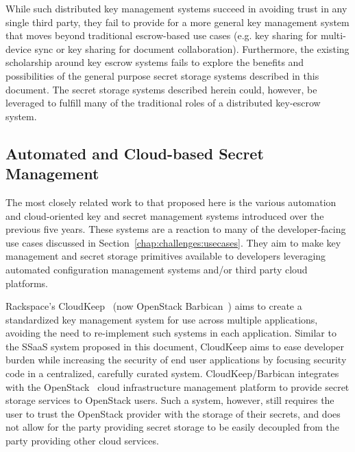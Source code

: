 While such distributed key management systems succeed in avoiding
trust in any single third party, they fail to provide for a more
general key management system that moves beyond traditional
escrow-based use cases (e.g. key sharing for multi-device sync or key
sharing for document collaboration). Furthermore, the existing
scholarship around key escrow systems fails to explore the benefits
and possibilities of the general purpose secret storage systems
described in this document. The secret storage systems described
herein could, however, be leveraged to fulfill many of the traditional
roles of a distributed key-escrow system.

\subsection{Automated and Cloud-based Secret Management}

The most closely related work to that proposed here is the various
automation and cloud-oriented key and secret management systems
introduced over the previous five years. These systems are a reaction
to many of the developer-facing use cases discussed in
Section~\ref{chap:challenges:usecases}. They aim to make key
management and secret storage primitives available to developers
leveraging automated configuration management systems and/or third
party cloud platforms.

Rackspace's CloudKeep~\cite{cloudkeep-presentation, cloudkeep} (now
OpenStack Barbican~\cite{openstack-barbican}) aims to create a
standardized key management system for use across multiple
applications, avoiding the need to re-implement such systems in each
application. Similar to the SSaaS system proposed in this document,
CloudKeep aims to ease developer burden while increasing the security
of end user applications by focusing security code in a centralized,
carefully curated system. CloudKeep/Barbican integrates with the
OpenStack~\cite{openstack} cloud infrastructure management platform to
provide secret storage services to OpenStack users. Such a system,
however, still requires the user to trust the OpenStack provider with
the storage of their secrets, and does not allow for the party
providing secret storage to be easily decoupled from the party
providing other cloud services.

